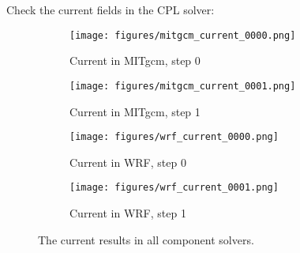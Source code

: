 
Check the current fields in the CPL solver:

\begin{figure}[h!]
\centering
  \begin{subfigure}[b]{0.45\linewidth}
  \texttt{[image: figures/mitgcm\_current\_0000.png]}
  \caption{Current in MITgcm, step 0}
  \end{subfigure}
  \begin{subfigure}[b]{0.45\linewidth}
  \texttt{[image: figures/mitgcm\_current\_0001.png]}
  \caption{Current in MITgcm, step 1}
  \end{subfigure}
  \hspace{0.1in}
  \begin{subfigure}[b]{0.45\linewidth}
  \texttt{[image: figures/wrf\_current\_0000.png]}
  \caption{Current in WRF, step 0}
  \end{subfigure}
  \begin{subfigure}[b]{0.45\linewidth}
  \texttt{[image: figures/wrf\_current\_0001.png]}
  \caption{Current in WRF, step 1}
  \end{subfigure}
\caption{The current results in all component solvers.}
\label{fig:current}
\end{figure}
